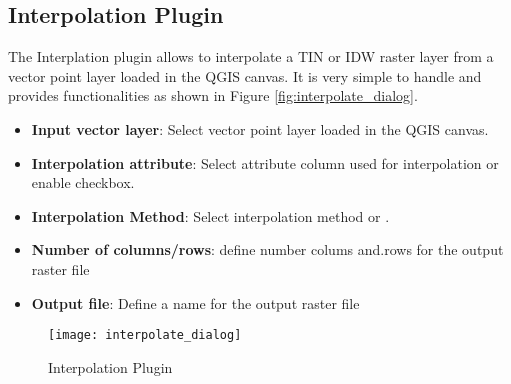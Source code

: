 
\subsection{Interpolation Plugin}

\updatedisclaimer

The Interplation plugin allows to interpolate a TIN or IDW raster layer from a vector 
point layer loaded in the QGIS canvas. It is very simple to handle and provides 
functionalities as shown in Figure \ref{fig:interpolate_dialog}.

\begin{itemize}
\item \textbf{Input vector layer}: Select vector point layer loaded in the QGIS canvas.
\item \textbf{Interpolation attribute}: Select attribute column used for interpolation or 
enable  checkbox.
\item \textbf{Interpolation Method}: Select interpolation method  or .
\item \textbf{Number of columns/rows}: define number colums and.rows for the output raster file
\item \textbf{Output file}: Define a name for the output raster file
\end{itemize}

\begin{figure}[ht]
   \begin{center}
   \caption{Interpolation Plugin \nixcaption}\label{fig:interpolation_dialog}\smallskip
   \texttt{[image: interpolate\_dialog]}
\end{center}  
\end{figure}


